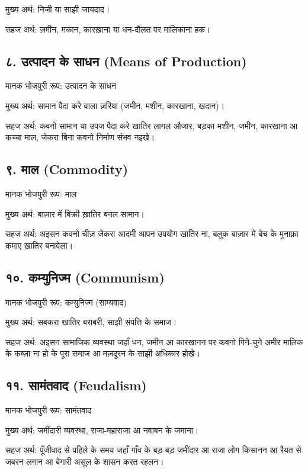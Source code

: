 \documentclass[12pt,a4paper,oneside]{book}
\begin{document}
मुख्य अर्थ: निजी या साझी जायदाद।

सहज अर्थ: ज़मीन, मकान, कारख़ाना या धन-दौलत पर मालिकाना हक।


\subsection*{८. उत्पादन के साधन {\engfont (Means of Production)}}
मानक भोजपुरी रूप: उत्पादन के साधन

मुख्य अर्थ: सामान पैदा करे वाला ज़रिया (जमीन, मशीन, कारखाना, खदान)।

सहज अर्थ: कवनो सामान या उपज पैदा करे खातिर लागल औजार, बड़का मशीन, जमीन, कारखाना आ कच्चा माल, जेकरा बिना कवनो निर्माण संभव नइखे।


\subsection*{९. माल {\engfont (Commodity)}}
मानक भोजपुरी रूप: माल

मुख्य अर्थ: बाज़ार में बिक्री ख़ातिर बनल सामान।

सहज अर्थ: अइसन कवनो चीज़ जेकरा आदमी आपन उपयोग खातिर ना, बलुक बाज़ार में बेच के मुनाफ़ा कमाए ख़ातिर बनावेला।


\subsection*{१०. कम्युनिज्म {\engfont (Communism)}}
मानक भोजपुरी रूप: कम्युनिज्म (साम्यवाद)

मुख्य अर्थ: सबकरा खातिर बराबरी, साझी संपत्ति के समाज।

सहज अर्थ: अइसन सामाजिक व्यवस्था जहाँ धन, जमीन आ कारखानन पर कवनो गिने-चुने अमीर मालिक के कब्ज़ा ना हो के पूरा समाज आ मज़दूरन के साझी अधिकार होखे।


\subsection*{११. सामंतवाद {\engfont (Feudalism)}}
मानक भोजपुरी रूप: सामंतवाद

मुख्य अर्थ: जमींदारी व्यवस्था, राजा-महाराजा आ नवाबन के जमाना।

सहज अर्थ: पूँजीवाद से पहिले के समय जहाँ गाँव के बड़-बड़ जमींदार आ राजा लोग किसानन आ रैयत से जबरन लगान आ बेगारी असूल के शासन करत रहलन।
\end{document}
